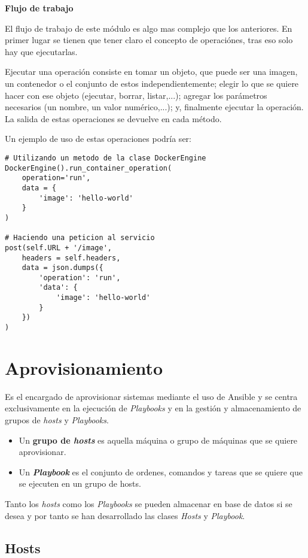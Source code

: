 \bigskip
\textbf{Flujo de trabajo}

El flujo de trabajo de este módulo es algo mas complejo que los anteriores. En primer lugar se tienen que tener claro el concepto de operaciónes, tras eso solo hay que ejecutarlas.

Ejecutar una operación consiste en tomar un objeto, que puede ser una imagen, un contenedor o el conjunto de estos independientemente; elegir lo que se quiere hacer con ese objeto (ejecutar, borrar, listar,...); agregar los parámetros necesarios (un nombre, un valor numérico,...); y, finalmente ejecutar la operación. La salida de estas operaciones se devuelve en cada método.

\smallskip
Un ejemplo de uso de estas operaciones podría ser:

\begin{lstlisting}
# Utilizando un metodo de la clase DockerEngine
DockerEngine().run_container_operation(
	operation='run',
	data = {
		'image': 'hello-world'
	}
)

# Haciendo una peticion al servicio
post(self.URL + '/image',
	headers = self.headers,
	data = json.dumps({
		'operation': 'run',
		'data': {
			'image': 'hello-world'
		}
	})
)
\end{lstlisting}


\section{Aprovisionamiento}


Es el encargado de aprovisionar sistemas mediante el uso de Ansible y se centra exclusivamente en la ejecución de \textit{Playbooks} y en la gestión y almacenamiento de grupos de \textit{hosts} y \textit{Playbooks}.
\begin{itemize}
	\item Un \textbf{grupo de \textit{hosts}} es aquella máquina o grupo de máquinas que se quiere aprovisionar.
	\item Un \textit{\textbf{Playbook}} es el conjunto de ordenes, comandos y tareas que se quiere que se ejecuten en un grupo de hosts.
\end{itemize}

Tanto los \textit{hosts} como los \textit{Playbooks} se pueden almacenar en base de datos si se desea y por tanto se han desarrollado las clases \textit{Hosts} y \textit{Playbook}.



\subsection{Hosts}


